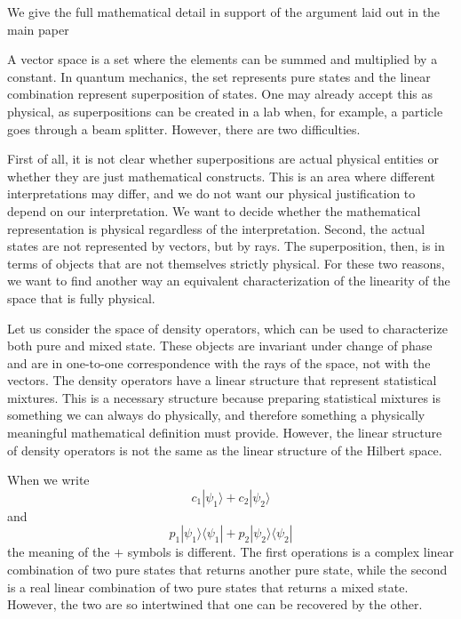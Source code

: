 \documentclass[10pt,twocolumn, nofootinbib]{revtex4-2}
\def\>{\rangle}
\def\<{\langle}
\begin{document}
We give the full mathematical detail in support of the argument laid out in the main paper




A vector space is a set where the elements can be summed and multiplied by a constant. In quantum mechanics, the set represents pure states and the linear combination represent superposition of states. One may already accept this as physical, as superpositions can be created in a lab when, for example, a particle goes through a beam splitter. However, there are two difficulties.

First of all, it is not clear whether superpositions are actual physical entities or whether they are just mathematical constructs. This is an area where different interpretations may differ, and we do not want our physical justification to depend on our interpretation. We want to decide whether the mathematical representation is physical regardless of the interpretation. Second, the actual states are not represented by vectors, but by rays. The superposition, then, is in terms of objects that are not themselves strictly physical. For these two reasons, we want to find another way an equivalent characterization of the linearity of the space that is fully physical.

Let us consider the space of density operators, which can be used to characterize both pure and mixed state. These objects are invariant under change of phase and are in one-to-one correspondence with the rays of the space, not with the vectors. The density operators have a linear structure that represent statistical mixtures. This is a necessary structure because preparing statistical mixtures is something we can always do physically, and therefore something a physically meaningful mathematical definition must provide. However, the linear structure of density operators is not the same as the linear structure of the Hilbert space.

When we write
$$c_1|\psi_1\> + c_2 |\psi_2\>$$
and 
$$p_1|\psi_1\>\<\psi_1| + p_2|\psi_2\>\<\psi_2|$$
the meaning of the $+$ symbols is different. The first operations is a complex linear combination of two pure states that returns another pure state, while the second is a real linear combination of two pure states that returns a mixed state. However, the two are so intertwined that one can be recovered by the other.
\end{document}

